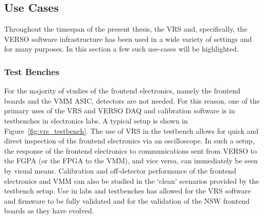 \subsection{Use Cases}
\label{sec:verso_use_cases}

Throughout the timespan of the present thesis, the VRS and, specifically, the VERSO software infrastructure
has been used in a wide variety of settings and for many purposes.
In this section a few such use-cases will be highlighted.

\subsubsection{Test Benches}
\label{sec:verso_test_bench}

For the majority of studies of the frontend electronics, namely the frontend boards
and the VMM ASIC, detectors are not needed.
For this reason, one of the primary uses of the VRS and VERSO DAQ and calibration software
is in testbenches in electronics labs.
A typical setup is shown in Figure~\ref{fig:vrs_testbench}.
The use of VRS in the testbench allows for quick and direct inspection
of the frontend electronics via an oscilloscope.
In such a setup, the response of the frontend electronics to communications sent
from VERSO to the FGPA (or the FPGA to the VMM), and vice versa, can immediately be seen
by visual means.
Calibration and off-detector performance of the frontend electronics and VMM can also be studied
in the `clean' scenarios provided by the testbench setup.
Use in labs and testbenches has allowed for the VRS software and firmware to be fully validated and for
the validation of the NSW frontend boards as they have evolved.

